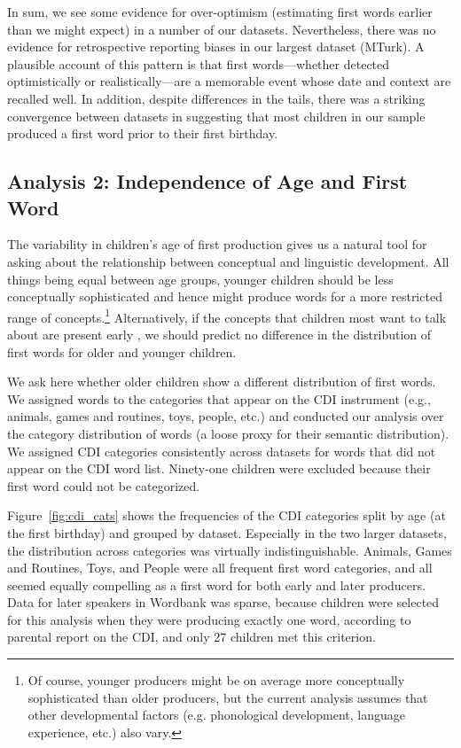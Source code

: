 \documentclass[10pt,letterpaper]{article}
\begin{document}
In sum, we see some evidence for over-optimism (estimating first words earlier than we might expect) in a number of our datasets. Nevertheless, there was no evidence for retrospective reporting biases in our largest dataset (MTurk). A plausible account of this pattern is that first words---whether detected optimistically or realistically---are a memorable event whose date and context are recalled well. In addition, despite differences in the tails, there was a striking convergence between datasets in suggesting that most children in our sample produced a first word prior to their first birthday. 

\subsection{Analysis 2: Independence of Age and First Word}

The variability in children's age of first production gives us a natural tool for asking about the relationship between conceptual and linguistic development. All things being equal between age groups, younger children should be less conceptually sophisticated and hence might produce words for a more restricted range of concepts.\footnote{Of course, younger producers might be on average more conceptually sophisticated than older producers, but the current analysis assumes that other developmental factors (e.g. phonological development, language experience, etc.) also vary.} Alternatively, if the concepts that children most want to talk about are present early \cite{snedeker2007,snedeker2012,gleitman1990}, we should predict no difference in the distribution of first words for older and younger children. 

We ask here whether older children show a different distribution of first words.  We assigned words to the categories that appear on the CDI instrument (e.g., animals, games and routines, toys, people, etc.) and conducted our analysis over the category distribution of words (a loose proxy for their semantic distribution). We assigned CDI categories consistently across datasets for words that did not appear on the CDI word list. Ninety-one children were excluded because their first word could not be categorized. 

Figure~\ref{fig:cdi_cats} shows the frequencies of the CDI categories split by age (at the first birthday) and grouped by dataset. Especially in the two larger datasets, the distribution across categories was virtually indistinguishable. Animals, Games and Routines, Toys, and People were all frequent first word categories, and all seemed equally compelling as a first word for both early and later producers. Data for later speakers in Wordbank was sparse, because children were selected for this analysis when they were producing exactly one word, according to parental report on the CDI, and only 27 children met this criterion.
\end{document}

